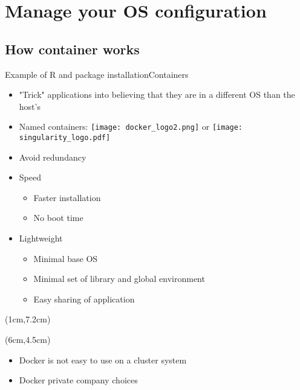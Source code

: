 \section{Manage your OS configuration}
\subsection{How container works}

\begin{frame}{Example of R and package installation}{Containers}
\begin{itemize}[<+->]
	\item "Trick" applications into believing that they are in a different OS than the host’s
	\item Named containers: \texttt{[image: docker\_logo2.png]} or \texttt{[image: singularity\_logo.pdf]}
	\item Avoid redundancy
	\item<5-> Speed
	\begin{itemize}[<5->]
		\item Faster installation
		\item No boot time
	\end{itemize}
	\item<6-> Lightweight
	\begin{itemize}[<6->]
		\item Minimal base OS
		\item Minimal set of library and global environment 
		\item Easy sharing of application 
	\end{itemize}	
\end{itemize}

\begin{textblock*}{10cm}(1cm,7.2cm) %
\end{textblock*}

\begin{textblock*}{10cm}(6cm,4.5cm) %
\end{textblock*}
\end{frame}


\begin{frame}

\begin{itemize}[<3>]
	\item Docker is not easy to use on a cluster system
	\item Docker private company choices
\end{itemize}
\end{frame}

